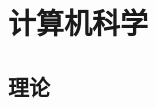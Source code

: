 \documentclass[UTF8]{NatureUniverse}
\begin{document}
\chapter{计算机科学}


\section{理论}
\end{document}
